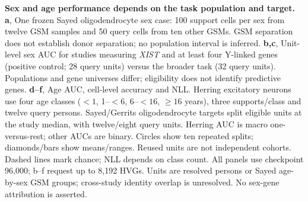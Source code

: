 \textbf{Sex and age performance depends on the task population and target.} \textbf{a}, One frozen Sayed oligodendrocyte sex case: 100 support cells per sex from twelve GSM samples and 50 query cells from ten other GSMs. GSM separation does not establish donor separation; no population interval is inferred. \textbf{b,c}, Unit-level sex AUC for studies measuring \textit{XIST} and at least four Y-linked genes (positive control; 28 query units) versus the broader task (32 query units). Populations and gene universes differ; eligibility does not identify predictive genes. \textbf{d--f}, Age AUC, cell-level accuracy and NLL. Herring excitatory neurons use four age classes ($<1$, 1--$<6$, 6--$<16$, $\geq16$ years), three supports/class and twelve query persons. Sayed/Gerrits oligodendrocyte targets split eligible units at the study median, with twelve/eight query units. Herring AUC is macro one-versus-rest; other AUCs are binary. Circles show ten repeated splits; diamonds/bars show means/ranges. Reused units are not independent cohorts. Dashed lines mark chance; NLL depends on class count. All panels use checkpoint 96,000; b--f request up to 8,192 HVGs. Units are resolved persons or Sayed age-by-sex GSM groups; cross-study identity overlap is unresolved. No sex-gene attribution is asserted.
